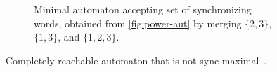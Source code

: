 \begin{example}
\begin{figure}[ht]
\begin{subfigure}[t]{0.31\textwidth}
{}%
			\caption{Minimal automaton accepting set of synchronizing words, obtained
				from \cref{fig:power-aut} by merging $\{2,3\}$,$\{1,3\}$, and $\{1,2,3\}$.}
		\end{subfigure}	
		\caption[Completely reachable but not sync-maximal automaton]{
			Completely reachable automaton that is not sync-maximal~\cite[Ex.~2]{BondarV16}.}
		\label{fig:not_sync_max}
	\end{figure}
\end{example} 

